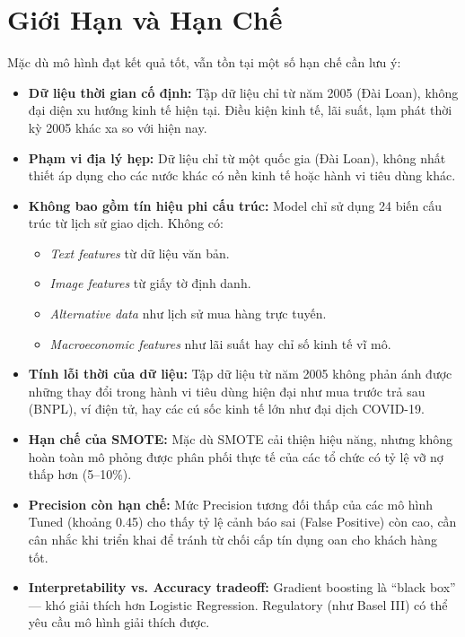\section{Giới Hạn và Hạn Chế}

Mặc dù mô hình đạt kết quả tốt, vẫn tồn tại một số hạn chế cần lưu ý:

\begin{itemize}

    \item \textbf{Dữ liệu thời gian cố định:} Tập dữ liệu chỉ từ năm 2005 (Đài Loan), không đại diện xu hướng kinh tế hiện tại. Điều kiện kinh tế, lãi suất, lạm phát thời kỳ 2005 khác xa so với hiện nay.
    
    \item \textbf{Phạm vi địa lý hẹp:} Dữ liệu chỉ từ một quốc gia (Đài Loan), không nhất thiết áp dụng cho các nước khác có nền kinh tế hoặc hành vi tiêu dùng khác.
    
    \item \textbf{Không bao gồm tín hiệu phi cấu trúc:} Model chỉ sử dụng 24 biến cấu trúc từ lịch sử giao dịch. Không có:
    \begin{itemize}
        \item \textit{Text features} từ dữ liệu văn bản.
        \item \textit{Image features} từ giấy tờ định danh.
        \item \textit{Alternative data} như lịch sử mua hàng trực tuyến.
        \item \textit{Macroeconomic features} như lãi suất hay chỉ số kinh tế vĩ mô.
    \end{itemize}
    
    \item \textbf{Tính lỗi thời của dữ liệu:} Tập dữ liệu từ năm 2005 không phản ánh được những thay đổi trong hành vi tiêu dùng hiện đại như mua trước trả sau (BNPL), ví điện tử, hay các cú sốc kinh tế lớn như đại dịch COVID-19.
    
    \item \textbf{Hạn chế của SMOTE:} Mặc dù SMOTE cải thiện hiệu năng, nhưng không hoàn toàn mô phỏng được phân phối thực tế của các tổ chức có tỷ lệ vỡ nợ thấp hơn (5--10\%).
    
    \item \textbf{Precision còn hạn chế:} Mức Precision tương đối thấp của các mô hình Tuned (khoảng 0.45) cho thấy tỷ lệ cảnh báo sai (False Positive) còn cao, cần cân nhắc khi triển khai để tránh từ chối cấp tín dụng oan cho khách hàng tốt.
    
    \item \textbf{Interpretability vs. Accuracy tradeoff:} Gradient boosting là ``black box'' --- khó giải thích hơn Logistic Regression. Regulatory (như Basel III) có thể yêu cầu mô hình giải thích được.

\end{itemize}


